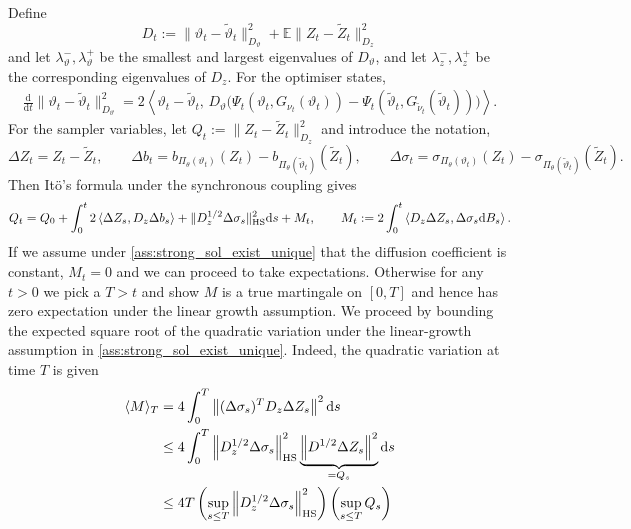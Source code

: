 Define
\[
    D_t
    :=
    \|\vartheta_t-\tilde\vartheta_t\|_{D_\vartheta}^2
    +
    \mathbb E\|Z_t-\tilde Z_t\|_{D_z}^2
\]
and let
\(\lambda_\vartheta^-,\lambda_\vartheta^+\) be the smallest and largest
eigenvalues of \(D_\vartheta\), and let \(\lambda_z^-,\lambda_z^+\) be the
corresponding eigenvalues of \({D_z}\). For the optimiser states,
\begin{align*}
    \frac{\mathrm d}{\mathrm dt}
    \|\vartheta_t-\tilde\vartheta_t\|_{D_\vartheta}^2
    =
    2\left\langle \vartheta_t-\tilde\vartheta_t,\,D_{\vartheta}\big(
    \Psi_t(\vartheta_t,G_{\nu_t}(\vartheta_t))
    -
    \Psi_t(\tilde\vartheta_t,G_{\tilde\nu_t}(\tilde\vartheta_t))\big)
    \right\rangle .
\end{align*}
For the sampler variables, let $Q_t:=\|Z_t-\tilde Z_t\|^2_{D_z}$ and introduce the notation,
\begin{equation*}
    \Delta Z_t=Z_t-\tilde Z_t,\qquad\Delta b_t=b_{\Pi_\theta(\vartheta_t)}(Z_t)
    -
    b_{\Pi_\theta(\tilde\vartheta_t)}(\tilde Z_t),\qquad \Delta\sigma_t=\sigma_{\Pi_\theta(\vartheta_t)}(Z_t)
    -
    \sigma_{\Pi_\theta(\tilde\vartheta_t)}(\tilde Z_t).
\end{equation*}
Then It\"o's formula under the synchronous coupling gives
\begin{align*}
    Q_t=Q_0+\int_0^t2\left\langle \Delta Z_s,D_z\Delta b_s
    \right\rangle + \| D^{1/2}_z\Delta \sigma_s \|^2_{\mathrm{HS}}\mathrm{d} s +M_t,\qquad M_t:= 2\int_0^t\left\langle D_z\Delta Z_s,\Delta \sigma_s\mathrm{d} B_s\right\rangle.
\end{align*}
If we assume under \ref{ass:strong_sol_exist_unique} that the diffusion coefficient is constant, $M_t=0$ and we can proceed to take expectations. Otherwise for any $t>0$ we pick a $T>t$ and show $M$ is a true martingale on $[0,T]$ and hence has zero expectation under the linear growth assumption. We proceed by bounding the expected square root of the quadratic variation under the linear-growth assumption in \ref{ass:strong_sol_exist_unique}. Indeed, the quadratic variation at time $T$ is given
\begin{align*}
    \langle M\rangle_T&=4\int_0^T\left\|(\Delta\sigma_s)^TD_z\Delta Z_s\right\|^2\mathrm{d} s \\
    &\le 4\int_0^T \left\|D^{1/2}_z\Delta\sigma_s\right\|^2_{\mathrm{HS}}\underbrace{\left\|D^{1/2}\Delta Z_s\right\|^2}_{=Q_s}\mathrm{d} s \\
    &\le 4T\left(\sup_{s\le T}\left\|D^{1/2}_z\Delta\sigma_s\right\|^2_{\mathrm{HS}}\right)\left(\sup_{s\le T} Q_s\right)
\end{align*}
